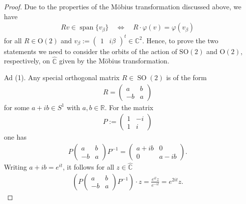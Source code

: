 \documentclass{amsart}
\newcommand{\R}{\mathbb{R}}
\newcommand{\C}{\mathbb{C}}
\DeclareMathOperator{\SO}{SO}
\DeclareMathOperator{\spann}{span}
\begin{document}
\begin{proof}
    Due to the properties of the Möbius transformation discussed above, we have
    \begin{align*}
        Rv \in \spann \{ v_\beta \}
        \quad \Leftrightarrow\quad 
        R \cdot \varphi(v) = \varphi(v_\beta)
    \end{align*}
    for all $R \in \mathrm{O}(2)$ and $v_\beta := \begin{pmatrix}
        1 & i \beta
    \end{pmatrix}^t\in\C^2$.
    Hence, to prove the two statements we need to consider the orbits of the action of $\mathrm{SO}(2)$ and $\mathrm{O}(2)$, respectively, on $\hat{\C}$ given by the M\"obius transformation.

    Ad (1). Any special orthogonal matrix $R \in \SO(2)$ is of the form
    \begin{align*}
        R = \begin{pmatrix}
            a   & b \\
            -b & a
        \end{pmatrix}
    \end{align*}
    for some $a+ib \in S^1$ with $a, b \in \R$. For the matrix
    \begin{align*}
        P := \begin{pmatrix}
            1 & -i \\
            1 & i
        \end{pmatrix}
    \end{align*}
    one has
    \begin{align*}
        P \begin{pmatrix}
            a   & b \\
            -b & a
        \end{pmatrix}
        P^{-1} 
        = \begin{pmatrix}
            a +ib  & 0 \\
            0 & a-ib
        \end{pmatrix}.
    \end{align*}
    Writing $a+ib = e^{it}$, it follows for all $z \in \hat{\C}$
    \begin{align*}
        \left(P \begin{pmatrix}
            a   & b \\
            -b & a
        \end{pmatrix}
        P^{-1}\right)
        \cdot z = \frac{e^{it}z}{e^{-it}} = e^{2it}z.
    \end{align*}

\end{proof}
\end{document}
